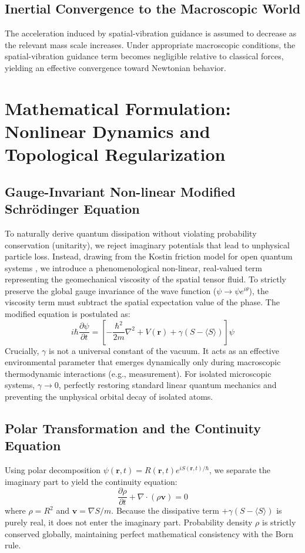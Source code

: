 \documentclass[reprint,amsmath,amssymb,aps,prd]{revtex4-2}
\begin{document}
\subsection{Inertial Convergence to the Macroscopic World}
The acceleration induced by spatial-vibration guidance is assumed to decrease as the relevant mass scale increases. Under appropriate macroscopic conditions, the spatial-vibration guidance term becomes negligible relative to classical forces, yielding an effective convergence toward Newtonian behavior.

\section{Mathematical Formulation: Nonlinear Dynamics and Topological Regularization}

\subsection{Gauge-Invariant Non-linear Modified Schr\"{o}dinger Equation}
To naturally derive quantum dissipation without violating probability conservation (unitarity), we reject imaginary potentials that lead to unphysical particle loss. Instead, drawing from the Kostin friction model for open quantum systems \cite{Kostin1972}, we introduce a phenomenological non-linear, real-valued term representing the geomechanical viscosity of the spatial tensor fluid. To strictly preserve the global gauge invariance of the wave function ($\psi \to \psi e^{i\theta}$), the viscosity term must subtract the spatial expectation value of the phase. The modified equation is postulated as:
\begin{equation}
i\hbar \frac{\partial \psi}{\partial t} = \left[ -\frac{\hbar^2}{2m} \nabla^2 + V(\mathbf{r}) + \gamma(S - \langle S \rangle) \right] \psi
\end{equation}
Crucially, $\gamma$ is not a universal constant of the vacuum. It acts as an effective environmental parameter that emerges dynamically only during macroscopic thermodynamic interactions (e.g., measurement). For isolated microscopic systems, $\gamma \to 0$, perfectly restoring standard linear quantum mechanics and preventing the unphysical orbital decay of isolated atoms.

\subsection{Polar Transformation and the Continuity Equation}
Using polar decomposition $\psi(\mathbf{r}, t) = R(\mathbf{r}, t) e^{iS(\mathbf{r}, t)/\hbar}$, we separate the imaginary part to yield the continuity equation:
\begin{equation}
\frac{\partial \rho}{\partial t} + \nabla \cdot (\rho \mathbf{v}) = 0
\end{equation}
where $\rho = R^2$ and $\mathbf{v} = \nabla S / m$. Because the dissipative term $+\gamma(S - \langle S \rangle)$ is purely real, it does not enter the imaginary part. Probability density $\rho$ is strictly conserved globally, maintaining perfect mathematical consistency with the Born rule.
\end{document}
